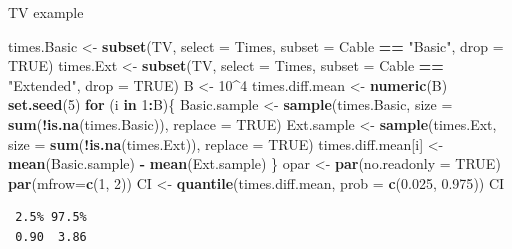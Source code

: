 \documentclass[
  ignorenonframetext,
]{beamer}
\newenvironment{Shaded}{\begin{snugshade}}{\end{snugshade}}
\newcommand{\AttributeTok}[1]{\textcolor[rgb]{0.13,0.29,0.53}{#1}}
\newcommand{\ConstantTok}[1]{\textcolor[rgb]{0.56,0.35,0.01}{#1}}
\newcommand{\ControlFlowTok}[1]{\textcolor[rgb]{0.13,0.29,0.53}{\textbf{#1}}}
\newcommand{\DecValTok}[1]{\textcolor[rgb]{0.00,0.00,0.81}{#1}}
\newcommand{\FloatTok}[1]{\textcolor[rgb]{0.00,0.00,0.81}{#1}}
\newcommand{\FunctionTok}[1]{\textcolor[rgb]{0.13,0.29,0.53}{\textbf{#1}}}
\newcommand{\NormalTok}[1]{#1}
\newcommand{\OtherTok}[1]{\textcolor[rgb]{0.56,0.35,0.01}{#1}}
\newcommand{\SpecialCharTok}[1]{\textcolor[rgb]{0.81,0.36,0.00}{\textbf{#1}}}
\newcommand{\StringTok}[1]{\textcolor[rgb]{0.31,0.60,0.02}{#1}}
\begin{document}
\begin{frame}[fragile]{TV example}
\label{tv-example-3}
\tiny

\begin{Shaded}
\begin{Highlighting}[]
\NormalTok{times.Basic }\OtherTok{\textless{}{-}} \FunctionTok{subset}\NormalTok{(TV, }\AttributeTok{select =}\NormalTok{ Times, }
                      \AttributeTok{subset =}\NormalTok{ Cable }\SpecialCharTok{==} \StringTok{"Basic"}\NormalTok{, }\AttributeTok{drop =} \ConstantTok{TRUE}\NormalTok{)}
\NormalTok{times.Ext }\OtherTok{\textless{}{-}} \FunctionTok{subset}\NormalTok{(TV, }\AttributeTok{select =}\NormalTok{ Times, }
                    \AttributeTok{subset =}\NormalTok{ Cable }\SpecialCharTok{==} \StringTok{"Extended"}\NormalTok{, }\AttributeTok{drop =} \ConstantTok{TRUE}\NormalTok{)}
\NormalTok{B }\OtherTok{\textless{}{-}} \DecValTok{10}\SpecialCharTok{\^{}}\DecValTok{4}
\NormalTok{times.diff.mean }\OtherTok{\textless{}{-}} \FunctionTok{numeric}\NormalTok{(B)}
\FunctionTok{set.seed}\NormalTok{(}\DecValTok{5}\NormalTok{)}
\ControlFlowTok{for}\NormalTok{ (i }\ControlFlowTok{in} \DecValTok{1}\SpecialCharTok{:}\NormalTok{B)\{}
\NormalTok{  Basic.sample }\OtherTok{\textless{}{-}} \FunctionTok{sample}\NormalTok{(times.Basic, }
                  \AttributeTok{size =} \FunctionTok{sum}\NormalTok{(}\SpecialCharTok{!}\FunctionTok{is.na}\NormalTok{(times.Basic)), }\AttributeTok{replace =} \ConstantTok{TRUE}\NormalTok{)}
\NormalTok{  Ext.sample }\OtherTok{\textless{}{-}} \FunctionTok{sample}\NormalTok{(times.Ext,}
                  \AttributeTok{size =} \FunctionTok{sum}\NormalTok{(}\SpecialCharTok{!}\FunctionTok{is.na}\NormalTok{(times.Ext)), }\AttributeTok{replace =} \ConstantTok{TRUE}\NormalTok{)}
\NormalTok{  times.diff.mean[i] }\OtherTok{\textless{}{-}} \FunctionTok{mean}\NormalTok{(Basic.sample) }\SpecialCharTok{{-}} \FunctionTok{mean}\NormalTok{(Ext.sample)}
\NormalTok{\}}
\NormalTok{opar }\OtherTok{\textless{}{-}} \FunctionTok{par}\NormalTok{(}\AttributeTok{no.readonly =} \ConstantTok{TRUE}\NormalTok{)}
\FunctionTok{par}\NormalTok{(}\AttributeTok{mfrow=}\FunctionTok{c}\NormalTok{(}\DecValTok{1}\NormalTok{, }\DecValTok{2}\NormalTok{))}
\NormalTok{CI }\OtherTok{\textless{}{-}} \FunctionTok{quantile}\NormalTok{(times.diff.mean, }\AttributeTok{prob =} \FunctionTok{c}\NormalTok{(}\FloatTok{0.025}\NormalTok{, }\FloatTok{0.975}\NormalTok{))}
\NormalTok{CI}
\end{Highlighting}
\end{Shaded}

\begin{verbatim}
 2.5% 97.5% 
 0.90  3.86 
\end{verbatim}

\normalsize
\end{frame}
\end{document}
